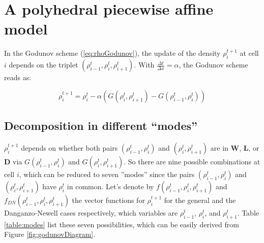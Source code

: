 \section{A polyhedral piecewise affine model}

In the Godunov scheme (\ref{eq:rhoGodunov}), the update of the density $\rho^{t+1}_{i}$ at cell $i$ depends on the triplet $(\rho^{t}_{i-1}, \rho^{t}_{i}, \rho^{t}_{i+1})$. With $\frac{\Delta t}{\Delta x}=\alpha$, the Godunov scheme reads as:

\begin{equation} \label{eq:rhoGodunov2}
\rho^{t+1}_{i} = \rho^{t}_{i} - \alpha\left(G(\rho^{t}_{i},\rho^{t}_{i+1})-G(\rho^{t}_{i-1},\rho^{t}_{i})\right)
\end{equation}

\subsection{Decomposition in different ``modes''}\label{sec:decompositionModes}

$\rho^{t+1}_{i}$ depends on whether both pairs $(\rho^{t}_{i-1}, \rho^{t}_{i})$ and $(\rho^{t}_{i}, \rho^{t}_{i+1})$ are in \textbf{W}, \textbf{L}, or \textbf{D} via $G(\rho^{t}_{i-1},\rho^{t}_{i})$ and $G(\rho^{t}_{i},\rho^{t}_{i+1})$. So there are nine possible combinations at cell $i$, which can be reduced to seven ''modes'' since the pairs $(\rho^{t}_{i-1}, \rho^{t}_{i})$ and $(\rho^{t}_{i}, \rho^{t}_{i+1})$ have $\rho^{t}_{i}$ in common. Let's denote by $f(\rho^{t}_{i-1},\rho^{t}_{i},\rho^{t}_{i+1})$ and $f_{DN}(\rho^{t}_{i-1},\rho^{t}_{i},\rho^{t}_{i+1})$ the vector functions for $\rho^{t+1}_{i}$ for the general and the Danganzo-Newell cases respectively, which variables are $\rho^{t}_{i-1}$, $\rho^{t}_{i}$, and $\rho^{t}_{i+1}$. Table \ref{table:modes} list these seven possibilities, which can be easily derived from Figure \ref{fig:godunovDiagram}.


